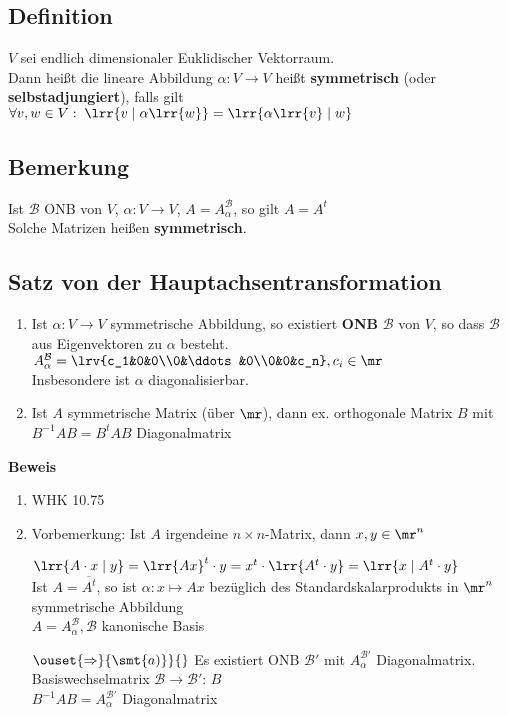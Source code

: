 \subsection{Definition}
	$V$ sei endlich dimensionaler Euklidischer Vektorraum.\\
	Dann heißt die lineare Abbildung $\alpha:V\rightarrow V$ heißt \textbf{symmetrisch} (oder \textbf{selbstadjungiert}), falls gilt $\forall v,w\in V:\;\lrr{v\mid\alpha\lrr{w}}=\lrr{\alpha\lrr{v}\mid w}$

\subsection{Bemerkung}
	Ist $\mathcal{B}$ ONB von $V$, $\alpha:V\rightarrow V$, $A=A_\alpha^{\mathcal{B}}$, so gilt $A=A^t$\\
	Solche Matrizen heißen \textbf{symmetrisch}.

\subsection{Satz von der Hauptachsentransformation}
	\begin{enumerate}
		\item Ist $\alpha: V\rightarrow V$ symmetrische Abbildung, so existiert \textbf{ONB} $\mathcal{B}$ von $V$, so dass $\mathcal{B}$ aus Eigenvektoren zu $\alpha$ besteht.\\
			$A_\alpha^{\mathcal{B}}=\lrv{c_1&0&0\\0&\ddots&0\\0&0&c_n}, c_i\in\mr$\\
			Insbesondere ist $\alpha$ diagonalisierbar.
		\item Ist $A$ symmetrische Matrix (über $\mr$), dann ex. orthogonale Matrix $B$ mit $B^{-1} A B =B^tAB$ Diagonalmatrix
	\end{enumerate}
	\textbf{Beweis}
	\begin{enumerate}
		\item WHK 10.75
		\item Vorbemerkung: Ist $A$ irgendeine $n\times n$-Matrix, dann $x,y\in\mr^n$
			
			$\lrr{A\cdot x\mid y} = \lrr{Ax}^t\cdot y = x^t\cdot\lrr{A^t\cdot y}=\lrr{x\mid A^t\cdot y}$\\
			Ist $A=\overline{A^t}$, so ist $\alpha: x\mapsto Ax$ bezüglich des Standardskalarprodukts in $\mr^n$ symmetrische Abbildung\\
			$A=A_\alpha^{\mathcal{B}}, \mathcal{B}$ kanonische Basis

			$\ouset{\Rightarrow}{\smt{a)}}{}$ Es existiert ONB $\mathcal{B}'$ mit $A_\alpha^{\mathcal{B}'}$ Diagonalmatrix.\\
			Basiswechselmatrix $\mathcal{B}\rightarrow\mathcal{B}'$: $B$\\
			$B^{-1}AB=A_\alpha^{\mathcal{B}'}$ Diagonalmatrix
	\end{enumerate}

